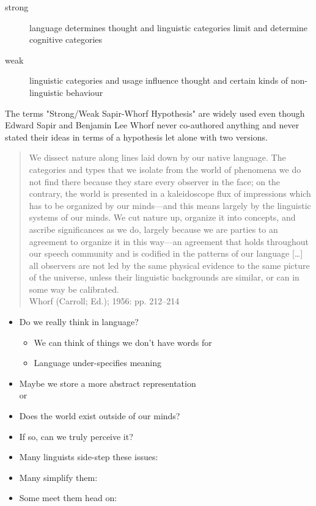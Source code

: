 \documentclass[headrule,footrule]{foils}
\begin{document}

\begin{description}
\item[strong]  language determines thought and  linguistic categories limit and determine cognitive categories
\item[weak]  linguistic categories and usage influence thought and certain kinds of non-linguistic behaviour
\end{description}

The terms "Strong/Weak Sapir-Whorf Hypothesis" are widely used even though Edward
Sapir and Benjamin Lee Whorf never co-authored anything and never
stated their ideas in terms of a hypothesis let alone with two versions.

\begin{quotation}
  We dissect nature along lines laid down by our native language. The
  categories and types that we isolate from the world of phenomena we
  do not find there because they stare every observer in the face; on
  the contrary, the world is presented in a kaleidoscope flux of
  impressions which has to be organized by our minds—and this means
  largely by the linguistic systems of our minds. We cut nature up,
  organize it into concepts, and ascribe significances as we do,
  largely because we are parties to an agreement to organize it in
  this way—an agreement that holds throughout our speech community and
  is codified in the patterns of our language [\ldots] all observers
  are not led by the same physical evidence to the same picture of the
  universe, unless their linguistic backgrounds are similar, or can in
  some way be calibrated.
\\ \hfill Whorf (Carroll; Ed.); 1956: pp. 212–214
\end{quotation}



\begin{itemize}\addtolength{\itemsep}{-1ex}
\item Do we really think in language? 
  \begin{itemize}
  \item We can think of things we don't have words for
  \item Language under-specifies meaning
  \end{itemize}
\item Maybe we store a more abstract representation
\\  or 
\item Does the world exist outside of our minds?
\item If so, can we truly perceive it?
\item Many linguists side-step these issues: 
\item Many simplify them: 
\item Some meet them head on: 
\end{itemize}
\end{document}
